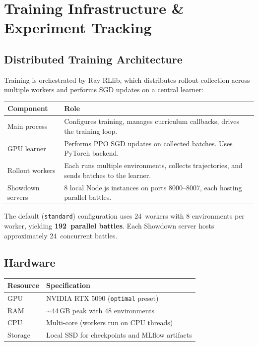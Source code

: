 \chapter{Training Infrastructure \& Experiment Tracking}
\label{ch:infrastructure}

\section{Distributed Training Architecture}

Training is orchestrated by Ray RLlib, which distributes rollout collection
across multiple workers and performs SGD updates on a central learner:

\begin{center}
\small
\begin{tabularx}{\textwidth}{l X}
  \toprule
  \textbf{Component} & \textbf{Role} \\
  \midrule
  Main process   & Configures training, manages curriculum callbacks,
                   drives the training loop. \\
  GPU learner     & Performs PPO SGD updates on collected batches.
                   Uses PyTorch backend. \\
  Rollout workers & Each runs multiple environments, collects trajectories,
                   and sends batches to the learner. \\
  Showdown servers & 8 local Node.js instances on ports 8000--8007,
                     each hosting parallel battles. \\
  \bottomrule
\end{tabularx}
\end{center}

The default (\texttt{standard}) configuration uses 24~workers with 8
environments per worker, yielding \textbf{192~parallel battles}.  Each Showdown
server hosts approximately 24~concurrent battles.

\section{Hardware}

\begin{center}
\small
\begin{tabularx}{0.8\textwidth}{l l}
  \toprule
  \textbf{Resource} & \textbf{Specification} \\
  \midrule
  GPU         & NVIDIA RTX 5090 (\texttt{optimal} preset) \\
  RAM         & $\sim$44\,GB peak with 48 environments \\
  CPU         & Multi-core (workers run on CPU threads) \\
  Storage     & Local SSD for checkpoints and MLflow artifacts \\
  \bottomrule
\end{tabularx}
\end{center}

